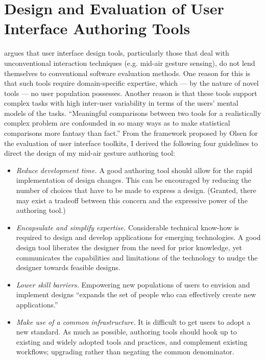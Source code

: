 \section{Design and Evaluation of User Interface Authoring Tools}
\label{sec:design-and-evaluation-of-tools}

\textcite{Olsen:2007} argues that user interface design tools, particularly those that deal with unconventional interaction techniques (e.g. mid-air gesture sensing), do not lend themselves to conventional software evaluation methods. One reason for this is that such tools require domain-specific expertise, which --- by the nature of novel tools --- no user population possesses. Another reason is that these tools support complex tasks with high inter-user variability in terms of the users’ mental models of the tasks. “Meaningful comparisons between two tools for a realistically complex problem are confounded in so many ways as to make statistical comparisons more fantasy than fact.” \parencite{Olsen:2007} From the framework proposed by Olsen for the evaluation of user interface toolkits, I derived the following four guidelines to direct the design of my mid-air gesture authoring tool:

\begin{itemize}
\item \emph{Reduce development time.} A good authoring tool should allow for the rapid implementation of design changes. This can be encouraged by reducing the number of choices that have to be made to express a design. (Granted, there may exist a tradeoff between this concern and the expressive power of the authoring tool.)
\item \emph{Encapsulate and simplify expertise.} Considerable technical know-how is required to design and develop applications for emerging technologies. A good design tool liberates the designer from the need for prior knowledge, yet communicates the capabilities and limitations of the technology to nudge the designer towards feasible designs.
\item \emph{Lower skill barriers.} Empowering new populations of users to envision and implement designs “expands the set of people who can effectively create new applications.” \parencite{Olsen:2007}
\item \emph{Make use of a common infrastructure.} It is difficult to get users to adopt a new standard. As much as possible, authoring tools should hook up to existing and widely adopted tools and practices, and complement existing workflows; upgrading rather than negating the common denominator.
\end{itemize}

